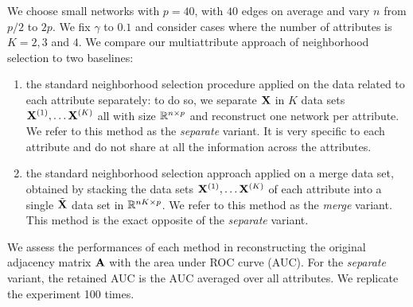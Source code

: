 We choose small networks with $p=40$, with $40$ edges on average and
vary $n$ from $p/2$ to $2p$. We fix $\gamma$ to $0.1$ and consider
cases where the number of attributes is $K=2,3$ and $4$. We compare
our multiattribute approach of neighborhood selection to two
baselines:
\begin{enumerate}
\item the standard neighborhood selection procedure applied on the
  data related to each attribute separately: to do so, we separate
  $\mathbf{X}$ in $K$ data sets $\mathbf{X}^{(1)}, \dots \mathbf{X}^{(K)}$ all with size
  $\mathbb{R}^{n\times p}$ and reconstruct one network per attribute. We refer to
  this method as the \textit{separate} variant. It is very specific to
  each attribute and do not share at all the information across the
  attributes.  
\item the standard neighborhood selection approach applied on a merge
  data set, obtained by stacking the data sets
  $\mathbf{X}^{(1)}, \dots \mathbf{X}^{(K)}$ of each attribute into a single
  $\tilde{\mathbf{X}}$ data set in $\mathbb{R}^{nK \times p}$. We refer to this
  method as the \textit{merge} variant. This method is the exact
  opposite of the \textit{separate} variant.
\end{enumerate}
We assess the performances of each method in reconstructing the
original adjacency matrix $\mathbf{A}$ with the area under ROC curve
(AUC). For the \textit{separate} variant, the retained AUC is the AUC
averaged over all attributes. We replicate the experiment 100 times.

